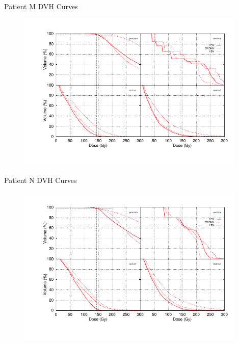 \documentclass{beamer}
\begin{document}
\begin{frame}{Patient M DVH Curves}
  
  \begin{figure}[h!]
    \begin{center}
      \includegraphics[width=4.3in]{figures/smith-all4x4.pdf}
    \end{center}
  \end{figure}

\end{frame}

\begin{frame}{Patient N DVH Curves}
  
  \begin{figure}[h!]
    \begin{center}
      \includegraphics[width=4.3in]{figures/wiese-all4x4.pdf}
    \end{center}
  \end{figure}

\end{frame}
\end{document}
